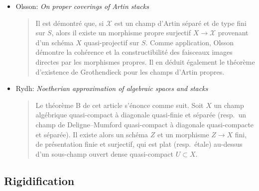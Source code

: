 \begin{itemize}
\begin{quote}
sur un corps et dont l'espace de modules grossier est quasi-projectif, admet un
revêtement fini et plat par un schéma lisse quasi-projectif.
\end{quote}
\item Olsson: \emph{On proper coverings of Artin stacks} \cite{olsson_proper}
\begin{quote}
Il est démontré que, si $\mathcal{X}$ est un champ d'Artin séparé
et de type fini sur $S$, alors
il existe un morphisme propre surjectif $X \to \mathcal{X}$ provenant d'un schéma
$X$ quasi-projectif sur $S$. Comme application, Olsson démontre la cohérence et
la constructibilité des faisceaux images directes par les morphismes propres. Il
en déduit également le théorème d'existence de Grothendieck pour les champs
d'Artin propres.
\end{quote}
\item Rydh: \emph{Noetherian approximation of algebraic spaces and stacks}
\cite{rydh_approx}
\begin{quote}
Le théorème B de cet article s'énonce comme suit.
Soit $X$ un champ algébrique quasi-compact à diagonale quasi-finie et séparée
(resp.\ un champ de Deligne--Mumford quasi-compact à diagonale quasi-compacte
et séparée). Il existe alors un schéma $Z$ et un morphisme $Z \to X$ fini,
de présentation finie et surjectif, qui est plat (resp.\ étale) au-dessus d'un
sous-champ ouvert dense quasi-compact $U \subset X$.
\end{quote}
\end{itemize}


\subsection{Rigidification}
\label{subsection-rigidification}

